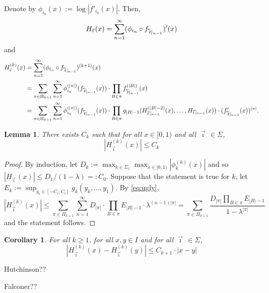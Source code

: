\documentclass[12pt,]{article}
\newtheorem{corollary}[theorem]{Corollary}
\newtheorem{lemma}[theorem]{Lemma}
\theoremstyle{definition}
\theoremstyle{remark}
\newcommand{\0}{\mathbf{0}}
\newcommand{\cev}[1]{\reflectbox{\ensuremath{\vec{\reflectbox{\ensuremath{#1}}}}}}
\newcommand{\bi}{\vec{\imath}\,}
\newcommand{\bbi}{\,\cev{\imath}}
\begin{document}
Denote by $\phi_{i_k}(x):= \log|f'_{i_k}(x)|$. Then,
\[
  H_{\bi}(x) = \sum_{n=1}^\infty (\phi_{i_n}\circ f_{\bbi|_{n-1}})'(x)
\]
and 
\begin{align}
  H_{\bi}^{(k)}(x) 
  &=\sum_{n=1}^\infty (\phi_{i_n}\circ f_{\bbi|_{n-1}})^{(k+1)}(x) \nonumber\\
  &=\sum_{\pi\in\Pi_{k+1}} \sum_{n=1}^\infty \phi_{i_n}^{(|\pi|)}(f_{\bbi|_{n-1}}(x))\cdot
  \prod_{B\in\pi} f_{\bbi|_{n-1}}^{(|B|)}(x)\nonumber\\
  &=\sum_{\pi\in\Pi_{k+1}} \sum_{n=1}^\infty \phi_{i_n}^{(|\pi|)}(f_{\bbi|_{n-1}}(x))\cdot
  \prod_{B\in\pi}
  g_{|B|-1}(H_{\bi|_{n-1}}^{(|B|-2)}(x),\dots,H_{\bi|_{n-1}}(x))\cdot(f'_{\bbi|_{n-1}}(x))^{|\pi|}.\label{eq:ugly}
\end{align}
\begin{lemma}
  There exists $C_k$ such that for all $x\in [0,1)$ and all $\bi\in\Sigma$,
  \[
    |H_{\bi}^{(k)}(x)|\leq C_k
  \]
\end{lemma}
\begin{proof}
  By induction, let $D_k:=\max_{k\in\Sigma_1}\max_{x\in[0,1)} |\phi_k^{(k)}(x)|$ and so
  $|H_{\bi}(x)| \leq D_1/(1-\lambda)=:C_0$.
  Suppose that the statement is true for $k$, let $E_k:= \sup_{y_i\in[-C_i,C_i]}g_k(y_k,\dots,y_1)$.
  By \ref{eq:ugly},
  \[
    |H_{\bi}^{(k)}(x)| \leq \sum_{\pi\in\Pi_{k+1}}\sum_{n=1}^\infty D_{|\pi|} \cdot \prod_{B\in\pi}
    E_{|B|-1} \cdot \lambda^{(n-1)|\pi|}
    = \sum_{\pi\in\Pi_{k+1}} \frac{D_{|\pi|}\prod_{B\in\pi}E_{|B|-1}}{1-\lambda^{|\pi|}}
  \]
  and the statement follows.
\end{proof}
\begin{corollary}
  For all $k\geq 1$, for all $x,y\in I$ and for all $\bi\in\Sigma$,
  \[
    |H_{\bi}^{(k)}(x) - H_{\bi}^{(k)}(y)| \leq C_{k+1}\cdot |x-y|
  \]
\end{corollary}

\begin{thebibliography}{99}
  Hutchinson??

  Falconer??

\end{thebibliography}
\end{document}
